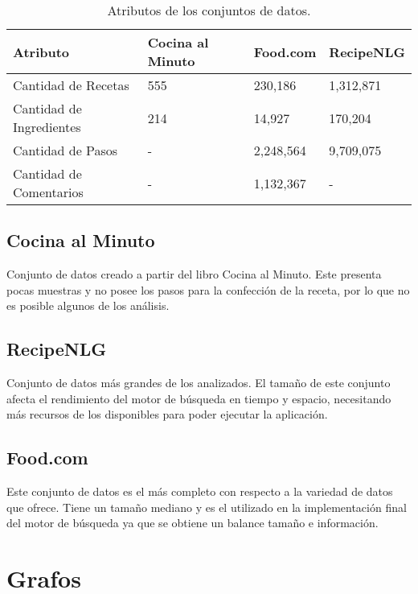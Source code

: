 \documentclass[
	a4paper, %
	10pt, %
	unnumberedsections, %
	twoside, %
]{LTJournalArticle}
\begin{document}
\begin{table*} %
	\caption{Atributos de los conjuntos de datos.}
	\centering
	\begin{tabular}{l l l l}
		\toprule
		Atributo 				 & Cocina al Minuto & Food.com & RecipeNLG  \\
		\midrule
		Cantidad de Recetas 	 & 555				& 230,186	& 1,312,871	\\
		Cantidad de Ingredientes & 214	 			& 14,927	& 170,204	\\
		Cantidad de Pasos 		 & -	 			& 2,248,564	& 9,709,075	\\
		Cantidad de Comentarios  & -	 			& 1,132,367	& -			\\
		\bottomrule
	\end{tabular}
	\label{tab:data_features}
\end{table*}

\subsection{Cocina al Minuto}

Conjunto de datos creado a partir del libro Cocina al Minuto. Este presenta pocas 
muestras y no posee los pasos para la confección de la receta, por lo que no es posible algunos de 
los análisis.

\subsection{RecipeNLG}

Conjunto de datos más grandes de los analizados. El tamaño de este conjunto afecta el rendimiento del motor
de búsqueda en tiempo y espacio, necesitando más recursos de los disponibles para poder ejecutar la aplicación.

\subsection{Food.com}

Este conjunto de datos es el más completo con respecto a la variedad de datos que ofrece. Tiene un tamaño mediano
y es el utilizado en la implementación final del motor de búsqueda ya que se obtiene un balance tamaño e información.


\section{Grafos}
\end{document}
